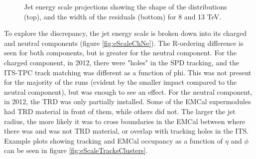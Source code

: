 \documentclass[ALICE]{ALICE_analysis_notes}
\begin{document}
\begin{figure}[h!]
    \centering
    \caption{Jet energy scale projections showing the shape of the distributions (top), and the width of the residuals (bottom) for 8 and 13 TeV.}
    \label{fig:eScaleShapeWidth}
\end{figure}

To explore the discrepancy, the jet energy scale is broken down into its charged and neutral components (figure \ref{fig:eScaleChNe}). The R-ordering difference is seen for both components, but is greater for the neutral component. For the charged component, in 2012, there were "holes" in the SPD tracking, and the ITS-TPC track matching was different as a function of phi. This was not present for the majority of the runs (evident by the smaller impact compared to the neutral component), but was enough to see an effect. For the neutral component, in 2012, the TRD was only partially installed. Some of the EMCal supermodules had TRD material in front of them, while others did not. The larger the jet radius, the more likely it was to cross boundaries in the EMCal between where there was and was not TRD material, or overlap with tracking holes in the ITS. Example plots showing tracking and EMCal occupancy as a function of $\eta$ and $\phi$ can be seen in figure \ref{fig:eScaleTracksClusters}.
\end{document}
